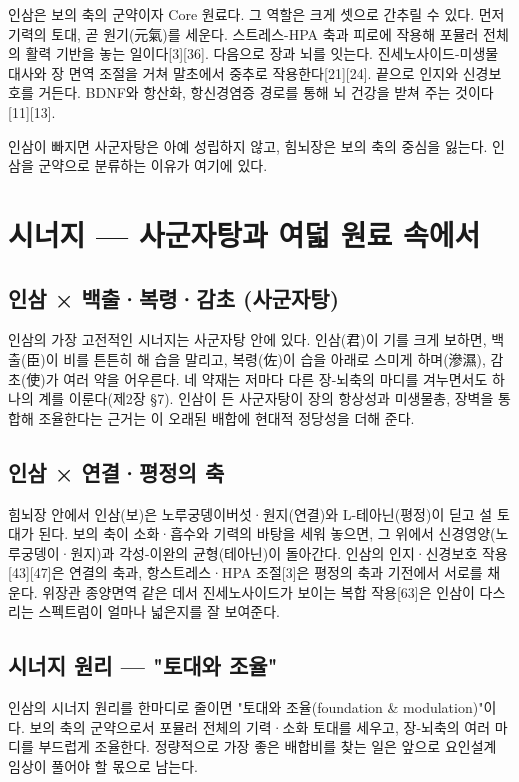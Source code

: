 \documentclass[12pt,oneside]{book}
\begin{document}
인삼은 보의 축의 군약이자 Core 원료다. 그 역할은 크게 셋으로 간추릴 수 있다. 먼저 기력의 토대, 곧 원기(元氣)를 세운다. 스트레스-HPA 축과 피로에 작용해 포뮬러 전체의 활력 기반을 놓는 일이다[3][36]. 다음으로 장과 뇌를 잇는다. 진세노사이드-미생물 대사와 장 면역 조절을 거쳐 말초에서 중추로 작용한다[21][24]. 끝으로 인지와 신경보호를 거든다. BDNF와 항산화, 항신경염증 경로를 통해 뇌 건강을 받쳐 주는 것이다[11][13].

인삼이 빠지면 사군자탕은 아예 성립하지 않고, 힘뇌장은 보의 축의 중심을 잃는다. 인삼을 군약으로 분류하는 이유가 여기에 있다.

\section{시너지 — 사군자탕과 여덟 원료 속에서}

\subsection{인삼 × 백출·복령·감초 (사군자탕)}

인삼의 가장 고전적인 시너지는 사군자탕 안에 있다. 인삼(君)이 기를 크게 보하면, 백출(臣)이 비를 튼튼히 해 습을 말리고, 복령(佐)이 습을 아래로 스미게 하며(滲濕), 감초(使)가 여러 약을 어우른다. 네 약재는 저마다 다른 장-뇌축의 마디를 겨누면서도 하나의 계를 이룬다(제2장 §7). 인삼이 든 사군자탕이 장의 항상성과 미생물총, 장벽을 통합해 조율한다는 근거는 이 오래된 배합에 현대적 정당성을 더해 준다.

\subsection{인삼 × 연결·평정의 축}

힘뇌장 안에서 인삼(보)은 노루궁뎅이버섯·원지(연결)와 L-테아닌(평정)이 딛고 설 토대가 된다. 보의 축이 소화·흡수와 기력의 바탕을 세워 놓으면, 그 위에서 신경영양(노루궁뎅이·원지)과 각성-이완의 균형(테아닌)이 돌아간다. 인삼의 인지·신경보호 작용[43][47]은 연결의 축과, 항스트레스·HPA 조절[3]은 평정의 축과 기전에서 서로를 채운다. 위장관 종양면역 같은 데서 진세노사이드가 보이는 복합 작용[63]은 인삼이 다스리는 스펙트럼이 얼마나 넓은지를 잘 보여준다.

\subsection{시너지 원리 — "토대와 조율"}

인삼의 시너지 원리를 한마디로 줄이면 "토대와 조율(foundation \& modulation)"이다. 보의 축의 군약으로서 포뮬러 전체의 기력·소화 토대를 세우고, 장-뇌축의 여러 마디를 부드럽게 조율한다. 정량적으로 가장 좋은 배합비를 찾는 일은 앞으로 요인설계 임상이 풀어야 할 몫으로 남는다.
\end{document}
